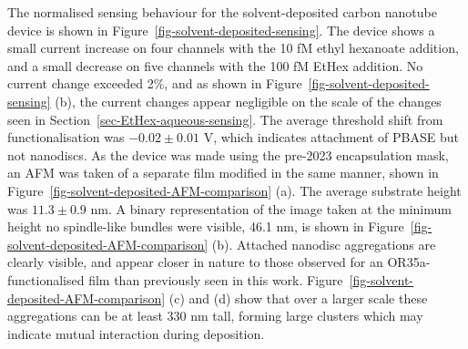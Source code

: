 \documentclass[
  a4paper,
]{scrbook}
\begin{document}
The normalised sensing behaviour for the solvent-deposited carbon
nanotube device is shown in Figure~\ref{fig-solvent-deposited-sensing}.
The device shows a small current increase on four channels with the 10
fM ethyl hexanoate addition, and a small decrease on five channels with
the 100 fM EtHex addition. No current change exceeded 2\%, and as shown
in Figure~\ref{fig-solvent-deposited-sensing} (b), the current changes
appear negligible on the scale of the changes seen in
Section~\ref{sec-EtHex-aqueous-sensing}. The average threshold shift
from functionalisation was \(-0.02\pm0.01\) V, which indicates
attachment of PBASE but not nanodiscs. As the device was made using the
pre-2023 encapsulation mask, an AFM was taken of a separate film
modified in the same manner, shown in
Figure~\ref{fig-solvent-deposited-AFM-comparison} (a). The average
substrate height was \(11.3\pm0.9\) nm. A binary representation of the
image taken at the minimum height no spindle-like bundles were visible,
46.1 nm, is shown in Figure~\ref{fig-solvent-deposited-AFM-comparison}
(b). Attached nanodisc aggregations are clearly visible, and appear
closer in nature to those observed for an OR35a-functionalised film
\autocite{Murugathas2020} than previously seen in this work.
Figure~\ref{fig-solvent-deposited-AFM-comparison} (c) and (d) show that
over a larger scale these aggregations can be at least 330 nm tall,
forming large clusters which may indicate mutual interaction during
deposition.
\end{document}
